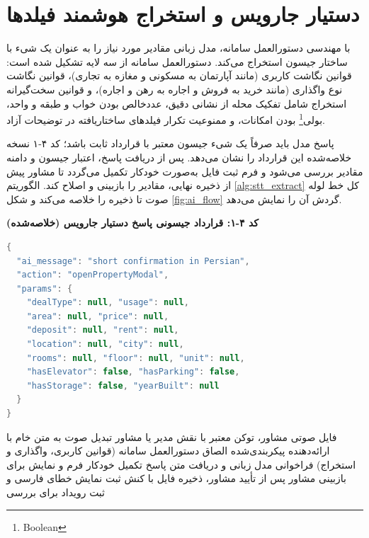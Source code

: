 \documentclass[11pt, a4paper]{report}
\newcommand{\enfootnote}[1]{\footnote{\foreignlanguage{english}{#1}}}
\begin{document}
\section{دستیار جارویس و استخراج هوشمند فیلدها}
با مهندسی دستورالعمل سامانه، مدل زبانی مقادیر مورد نیاز را به عنوان یک شیء با ساختار جیسون استخراج می‌کند. دستورالعمل سامانه از سه لایه تشکیل شده است: قوانین نگاشت کاربری (مانند آپارتمان به مسکونی و مغازه به تجاری)، قوانین نگاشت نوع واگذاری (مانند خرید به فروش و اجاره به رهن و اجاره)، و قوانین سخت‌گیرانه استخراج شامل تفکیک محله از نشانی دقیق، عددخالص بودن خواب و طبقه و واحد، بولی\enfootnote{Boolean} بودن امکانات، و ممنوعیت تکرار فیلدهای ساختاریافته در توضیحات آزاد.

پاسخ مدل باید صرفاً یک شیء جیسون معتبر با قرارداد ثابت باشد؛ کد ۴-۱ نسخه خلاصه‌شده این قرارداد را نشان می‌دهد. پس از دریافت پاسخ، اعتبار جیسون و دامنه مقادیر بررسی می‌شود و فرم ثبت فایل به‌صورت خودکار تکمیل می‌گردد تا مشاور پیش از ذخیره نهایی، مقادیر را بازبینی و اصلاح کند. الگوریتم \ref{alg:stt_extract} کل خط لوله صوت تا ذخیره را خلاصه می‌کند و شکل \ref{fig:ai_flow} گردش آن را نمایش می‌دهد.

\noindent\textbf{کد ۴-۱: قرارداد جیسونی پاسخ دستیار جارویس (خلاصه‌شده)}
\begin{otherlanguage}{english}
\begin{lstlisting}[language=Java]
{
  "ai_message": "short confirmation in Persian",
  "action": "openPropertyModal",
  "params": {
    "dealType": null, "usage": null,
    "area": null, "price": null,
    "deposit": null, "rent": null,
    "location": null, "city": null,
    "rooms": null, "floor": null, "unit": null,
    "hasElevator": false, "hasParking": false,
    "hasStorage": false, "yearBuilt": null
  }
}
\end{lstlisting}
\end{otherlanguage}

\begin{algorithm}[htbp]
\caption{خط لوله تبدیل صوت به فایل ملکی ذخیره‌شده}
\label{alg:stt_extract}
\begin{algorithmic}[1]
\REQUIRE فایل صوتی مشاور، توکن معتبر با نقش مدیر یا مشاور
\STATE تبدیل صوت به متن خام با ارائه‌دهنده پیکربندی‌شده
\STATE الصاق دستورالعمل سامانه (قوانین کاربری، واگذاری و استخراج)
\STATE فراخوانی مدل زبانی و دریافت متن پاسخ
\STATE تکمیل خودکار فرم و نمایش برای بازبینی مشاور
\STATE پس از تأیید مشاور، ذخیره فایل با کنش ثبت
\ELSE
\STATE نمایش خطای فارسی و ثبت رویداد برای بررسی
\ENDIF
\end{algorithmic}
\end{algorithm}
\end{document}
